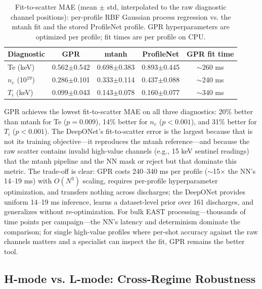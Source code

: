\documentclass[a4paper,12pt]{article}
\begin{document}
\begin{table}[htbp]
\centering\footnotesize
\caption{Fit-to-scatter MAE (mean $\pm$ std, interpolated to the raw diagnostic channel positions): per-profile RBF Gaussian process regression vs. the mtanh fit and the stored ProfileNet profile. GPR hyperparameters are optimized per profile; fit times are per profile on CPU.}
\label{tab:gpr}
\begin{tabular}{l c c c c}
\toprule
\textbf{Diagnostic} & \textbf{GPR} & \textbf{mtanh} & \textbf{ProfileNet} & \textbf{GPR fit time} \\
\midrule
Te (keV)       & 0.562$\pm$0.542 & 0.698$\pm$0.383 & 0.893$\pm$0.445 & $\sim$260 ms \\
$n_e$ (10$^{19}$) & 0.286$\pm$0.101 & 0.333$\pm$0.114 & 0.437$\pm$0.088 & $\sim$240 ms \\
$T_i$ (keV)    & 0.099$\pm$0.043 & 0.143$\pm$0.078 & 0.160$\pm$0.077 & $\sim$340 ms \\
\bottomrule
\end{tabular}
\end{table}

GPR achieves the lowest fit-to-scatter MAE on all three diagnostics: 20\% better than mtanh for Te ($p=0.009$), 14\% better for $n_e$ ($p<0.001$), and 31\% better for $T_i$ ($p<0.001$). The DeepONet's fit-to-scatter error is the largest because that is not its training objective---it reproduces the mtanh reference---and because the raw scatter contains invalid high-value channels (e.g., 15 keV sentinel readings) that the mtanh pipeline and the NN mask or reject but that dominate this metric. The trade-off is clear: GPR costs 240--340 ms per profile ($\sim$15$\times$ the NN's 14--19 ms) with $O(N^3)$ scaling, requires per-profile hyperparameter optimization, and transfers nothing across discharges; the DeepONet provides uniform 14--19 ms inference, learns a dataset-level prior over 161 discharges, and generalizes without re-optimization. For bulk EAST processing---thousands of time points per campaign---the NN's latency and determinism dominate the comparison; for single high-value profiles where per-shot accuracy against the raw channels matters and a specialist can inspect the fit, GPR remains the better tool.

\subsection{H-mode vs. L-mode: Cross-Regime Robustness}
\end{document}
